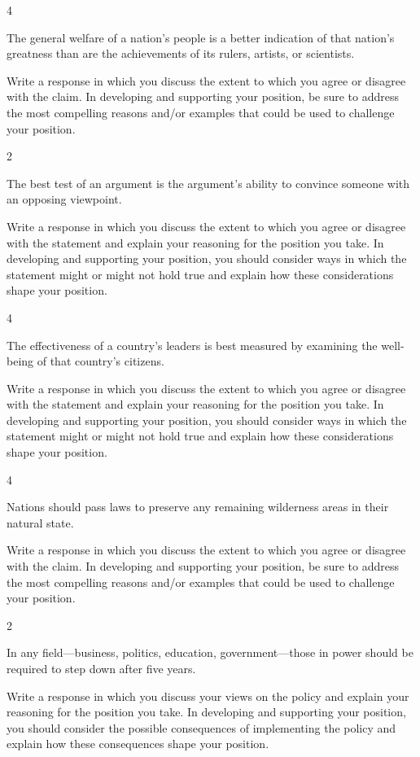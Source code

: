 \documentclass[]{article}
\begin{document}
4

The general welfare of a nation's people is a better indication of that
nation's greatness than are the achievements of its rulers, artists, or
scientists.

Write a response in which you discuss the extent to which you agree or
disagree with the claim. In developing and supporting your position, be
sure to address the most compelling reasons and/or examples that could
be used to challenge your position.

2

The best test of an argument is the argument's ability to convince
someone with an opposing viewpoint.

Write a response in which you discuss the extent to which you agree or
disagree with the statement and explain your reasoning for the position
you take. In developing and supporting your position, you should
consider ways in which the statement might or might not hold true and
explain how these considerations shape your position.

4

The effectiveness of a country's leaders is best measured by examining
the well-being of that country's citizens.

Write a response in which you discuss the extent to which you agree or
disagree with the statement and explain your reasoning for the position
you take. In developing and supporting your position, you should
consider ways in which the statement might or might not hold true and
explain how these considerations shape your position.

4

Nations should pass laws to preserve any remaining wilderness areas in
their natural state.

Write a response in which you discuss the extent to which you agree or
disagree with the claim. In developing and supporting your position, be
sure to address the most compelling reasons and/or examples that could
be used to challenge your position.

2

In any field---business, politics, education, government---those in
power should be required to step down after five years.

Write a response in which you discuss your views on the policy and
explain your reasoning for the position you take. In developing and
supporting your position, you should consider the possible consequences
of implementing the policy and explain how these consequences shape your
position.
\end{document}
